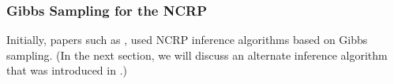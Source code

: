 \documentclass{article}
\begin{document}

\subsubsection{Gibbs Sampling for the NCRP}

Initially, papers such as \cite{griffiths2004hierarchical}, used NCRP inference algorithms based on Gibbs sampling.
(In the next section, we will discuss an alternate inference algorithm that was introduced in \cite{wang2009vi_ncrp}.)

\end{document}
